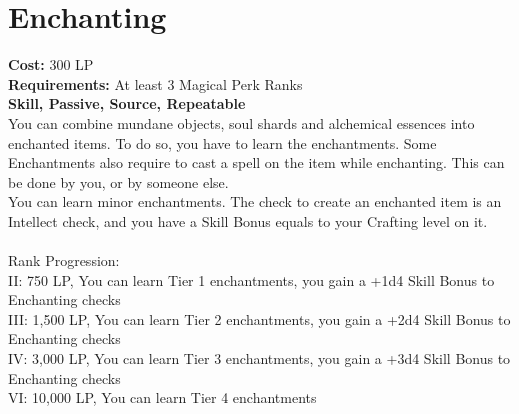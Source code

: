 \section{Enchanting}\label{perk:enchanting}
\textbf{Cost:} 300 LP\\
\textbf{Requirements:} At least 3 Magical Perk Ranks\\
\textbf{Skill, Passive, Source, Repeatable}\\
You can combine mundane objects, soul shards and alchemical essences into enchanted items.
To do so, you have to learn the enchantments.
Some Enchantments also require to cast a spell on the item while enchanting.
This can be done by you, or by someone else.\\
You can learn minor enchantments.
The check to create an enchanted item is an Intellect check, and you have a Skill Bonus equals to your Crafting level on it.\\
\\
Rank Progression:\\
II: 750 LP, You can learn Tier 1 enchantments, you gain a +1d4 Skill Bonus to Enchanting checks\\
III: 1,500 LP, You can learn Tier 2 enchantments, you gain a +2d4 Skill Bonus to Enchanting checks\\
IV: 3,000 LP, You can learn Tier 3 enchantments, you gain a +3d4 Skill Bonus to Enchanting checks\\
VI: 10,000 LP, You can learn Tier 4 enchantments\\